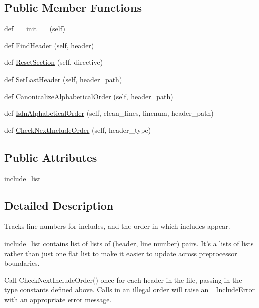 \subsection*{Public Member Functions}
\begin{DoxyCompactItemize}
\item 
def \hyperlink{classcpplint_1_1___include_state_a4d3ae4ee2a38efc25cce07e3e8484ba4}{\+\_\+\+\_\+init\+\_\+\+\_\+} (self)
\item 
def \hyperlink{classcpplint_1_1___include_state_a9bddbf581fc7a4c3c0258eaa42b94c3a}{Find\+Header} (self, \hyperlink{resize_8js_af920c2a7d4f4b5a962fe8e11257f871d}{header})
\item 
def \hyperlink{classcpplint_1_1___include_state_a31551f83fcc626e7babb1581a486b6fa}{Reset\+Section} (self, directive)
\item 
def \hyperlink{classcpplint_1_1___include_state_a9bc1ada2060a49628c1fffa973b57df1}{Set\+Last\+Header} (self, header\+\_\+path)
\item 
def \hyperlink{classcpplint_1_1___include_state_ae69c652befa2d160194c0a02ff0c7d48}{Canonicalize\+Alphabetical\+Order} (self, header\+\_\+path)
\item 
def \hyperlink{classcpplint_1_1___include_state_abfda27324121ab0bf9d29866d975274b}{Is\+In\+Alphabetical\+Order} (self, clean\+\_\+lines, linenum, header\+\_\+path)
\item 
def \hyperlink{classcpplint_1_1___include_state_a80f82f17565e8412e7e5bbe52b464f18}{Check\+Next\+Include\+Order} (self, header\+\_\+type)
\end{DoxyCompactItemize}
\subsection*{Public Attributes}
\begin{DoxyCompactItemize}
\item 
\hyperlink{classcpplint_1_1___include_state_a82d8b92a431437ee181e950517c71cbb}{include\+\_\+list}
\end{DoxyCompactItemize}


\subsection{Detailed Description}
\begin{DoxyVerb}Tracks line numbers for includes, and the order in which includes appear.

include_list contains list of lists of (header, line number) pairs.
It's a lists of lists rather than just one flat list to make it
easier to update across preprocessor boundaries.

Call CheckNextIncludeOrder() once for each header in the file, passing
in the type constants defined above. Calls in an illegal order will
raise an _IncludeError with an appropriate error message.\end{DoxyVerb}
 

